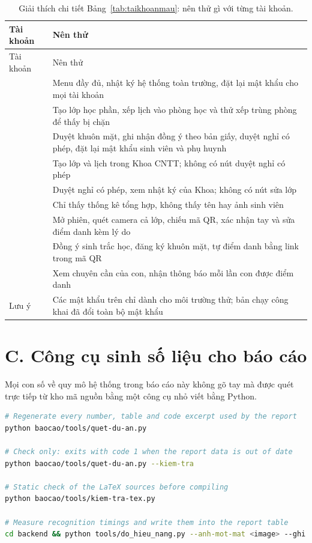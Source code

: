 {\small
\begin{xltabular}{\textwidth}{@{}>{\raggedright\arraybackslash\leavevmode}p{2.6cm} >{\raggedright\arraybackslash\leavevmode}X@{}}
\caption{Giải thích chi tiết Bảng~\ref{tab:taikhoanmau}: nên thử gì với từng tài khoản.}
\label{tab:taikhoanmau-gt}\\
\toprule
Tài khoản & Nên thử \\
\midrule
\endfirsthead
\toprule
Tài khoản & Nên thử \\
\midrule
\endhead
\bottomrule
\endfoot
{} & Menu đầy đủ, nhật ký hệ thống toàn trường, đặt lại mật khẩu cho mọi tài khoản \\
 & Tạo lớp học phần, xếp lịch vào phòng học và thử xếp trùng phòng để thấy bị chặn \\
 & Duyệt khuôn mặt, ghi nhận đồng ý theo bản giấy, duyệt nghỉ có phép, đặt lại mật khẩu sinh viên và phụ huynh \\
 & Tạo lớp và lịch trong Khoa CNTT; không có nút duyệt nghỉ có phép \\
 & Duyệt nghỉ có phép, xem nhật ký của Khoa; không có nút sửa lớp \\
 & Chỉ thấy thống kê tổng hợp, không thấy tên hay ảnh sinh viên \\
 & Mở phiên, quét camera cả lớp, chiếu mã QR, xác nhận tay và sửa điểm danh kèm lý do \\
 & Đồng ý sinh trắc học, đăng ký khuôn mặt, tự điểm danh bằng link trong mã QR \\
 & Xem chuyên cần của con, nhận thông báo mỗi lần con được điểm danh \\
Lưu ý & Các mật khẩu trên chỉ dành cho môi trường thử; bản chạy công khai đã đổi toàn bộ mật khẩu \\
\end{xltabular}}

\section*{C. Công cụ sinh số liệu cho báo cáo}
{}

Mọi con số về quy mô hệ thống trong báo cáo này không gõ tay mà được quét
trực tiếp từ kho mã nguồn bằng một công cụ nhỏ viết bằng Python.

\begin{lstlisting}[language=bash, caption={Sinh lại số liệu của báo cáo.}]
# Regenerate every number, table and code excerpt used by the report
python baocao/tools/quet-du-an.py

# Check only: exits with code 1 when the report data is out of date
python baocao/tools/quet-du-an.py --kiem-tra

# Static check of the LaTeX sources before compiling
python baocao/tools/kiem-tra-tex.py

# Measure recognition timings and write them into the report table
cd backend && python tools/do_hieu_nang.py --anh-mot-mat <image> --ghi
\end{lstlisting}


